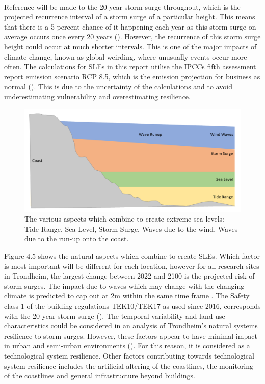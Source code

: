 \paragraph{}

Reference will be made to the 20 year storm surge throughout, which is the projected recurrence interval of a storm surge of a particular height.  This means that there is a 5 percent chance of it happening each year as this storm surge on average occurs once every 20 years (\cite{hanssen_saksframlegg_2013}). However, the recurrence of this storm surge height could occur at much shorter intervals.  This is one of the major impacts of climate change, known as global weirding, where unusually events occur more often. The calculations for SLEs in this report utilise the IPCCs fifth assessment report emission scenario RCP 8.5, which is the emission projection for business as normal (\cite{hanssen-bauer_climate_2017}). This is due to the uncertainty of the calculations and to avoid underestimating vulnerability and overestimating resilience.  



\begin{figure}[h!]
    \centering
    \includegraphics[width=1\textwidth]{fig_theory/sea level extremes.png}
    \caption{The various aspects which combine to create extreme sea levels: Tide Range, Sea Level, Storm Surge, Waves due to the wind, Waves due to the run-up onto the coast.}

    \label{fig:my_label}
\end{figure}

Figure 4.5 shows the natural aspects which combine to create SLEs. Which factor is most important will be different for each location, however for all research sites in Trondheim, the largest change between 2022 and 2100 is the projected risk of storm surges. The impact due to waves which may change with the changing climate is predicted to cap out at 2m within the same time frame \cite{hanssen_saksframlegg_2013}. The Safety class 1 of the building regulations TEK10/TEK17 as used since 2016, corresponds with the 20 year storm surge (\cite{tides_high_2022}). The temporal variability and land use characteristics could be considered in an analysis of Trondheim's natural systems resilience to storm surges. However, these factors appear to have minimal impact in urban and semi-urban environments (\cite{hoffken_effects_2020}). For this reason, it is considered as a technological system resilience. Other factors contributing towards technological system resilience includes the artificial altering of the coastlines, the monitoring of the coastlines and general infrastructure beyond buildings.

